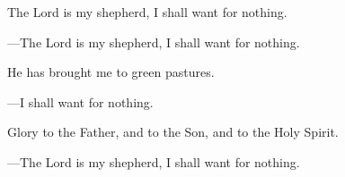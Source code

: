 \responsory
\begin{hangpar}

The Lord is my shepherd, I shall want for nothing.

{\color{red}---\thinspace}The Lord is my shepherd, I shall want for nothing.

\medskip He has brought me to green pastures.

{\color{red}---\thinspace}I shall want for nothing.

\medskip Glory to the Father, and to the Son, and to the Holy Spirit.

{\color{red}---\thinspace}The Lord is my shepherd, I shall want for nothing.
\end{hangpar}
